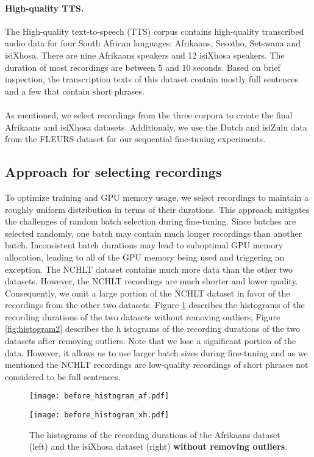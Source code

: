\paragraph*{High-quality TTS.}
The High-quality text-to-speech (TTS) \cite{hq2017} corpus contains high-quality transcribed audio data for four South African languages: Afrikaans, Sesotho, Setswana and isiXhosa.
There are nine Afrikaans speakers and 12 isiXhosa speakers.
The duration of most recordings are between $5$ and $10$ seconds.
Based on brief inspection, the transcription texts of this dataset contain mostly full sentences and a few that contain short phrases.
\\
\\
As mentioned, we select recordings from the three corpora to create the final Afrikaans and isiXhosa datasets.
Additionaly, we use the Dutch and isiZulu data from the FLEURS dataset for our sequential fine-tuning experiments.

\subsection{Approach for selecting recordings}
To optimize training and GPU memory usage, we select recordings to maintain a roughly uniform distribution in terms of their durations.
This approach mitigates the challenges of random batch selection during fine-tuning.
Since batches are selected randomly, one batch may contain much longer recordings than another batch.
Inconsistent batch durations may lead to suboptimal GPU memory allocation, leading to all of the GPU memory being used and triggering an exception.
The NCHLT dataset contains much more data than the other two datasets. However, the NCHLT recordings are much shorter and lower quality. 
Consequently, we omit a large portion of the NCHLT dataset in favor of the recordings from the other two datasets.
Figure \ref{fig:histogram1} describes the histograms of the recording durations of the two datasets without removing outliers,
Figure \ref{fig:histogram2} describes the h istograms of the recording durations of the two datasets after removing outliers.
Note that we lose a significant portion of the data. However, it allows us to use larger batch sizes during fine-tuning and as we mentioned the NCHLT
recordings are low-quality recordings of short phrases not considered to be full sentences.

\begin{figure}[!ht]
    \centering
    \begin{minipage}{.45\textwidth}
      \centering
      \texttt{[image: before\_histogram\_af.pdf]}
    \end{minipage}%
    \begin{minipage}{.45\textwidth}
      \centering
      \texttt{[image: before\_histogram\_xh.pdf]}
    \end{minipage}
    \caption{The histograms of the recording durations of the Afrikaans dataset (left) and the isiXhosa dataset (right) \textbf{without removing outliers}.}
    \label{fig:histogram1}
\end{figure}

